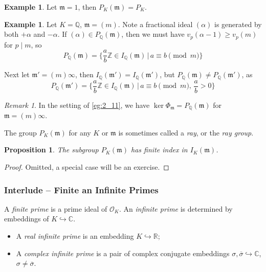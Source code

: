 \documentclass[11pt]{article}
\theoremstyle{definition}
\newtheorem{example}[definition]{Example}
\theoremstyle{plain}
\newtheorem{proposition}[definition]{Proposition}
\theoremstyle{remark}
\newtheorem{remark}[definition]{Remark}
\newcommand{\ZZ}{\mathbb{Z}}
\newcommand{\QQ}{\mathbb{Q}}
\newcommand{\RR}{\mathbb{R}}
\newcommand{\CC}{\mathbb{C}}
\newcommand{\cO}{\mathcal{O}}
\newcommand{\fm}{\mathfrak{m}}
\begin{document}
\begin{example}\label{eg:2_13}
    Let $\fm = 1$, then $P_K(\fm) = P_K$.
\end{example}

\begin{example}\label{eg:2_14}
    Let $K = \QQ$, $\fm = (m)$. Note a fractional ideal $(\alpha)$ is generated by both $+\alpha$ and $-\alpha$. If $(\alpha) \in P_\QQ(\fm)$, then we must have $v_p(\alpha - 1) \ge v_p(m)$ for $p \mid m$, so
    \begin{equation*}
        P_\QQ(\fm) = \bigg\{\frac{a}{b}\ZZ \in I_\QQ(\fm) \,\big\vert\, a \equiv b \pmod{m}\bigg\}
    \end{equation*}

    \noindent Next let $\fm' = (m) \infty$, then $I_\QQ(\fm') = I_\QQ(\fm')$, but $P_\QQ(\fm) \neq P_\QQ(\fm')$, as
    \begin{equation*}
        P_\QQ(\fm') = \bigg\{\frac{a}{b}\ZZ \in I_\QQ(\fm) \,\big\vert\, a \equiv b \pmod{m},\, \frac{a}{b} > 0\bigg\}
    \end{equation*}
\end{example}

\begin{remark}\label{remark:2_15}
    In the setting of \autoref{eg:2_11}, we have $\ker \Phi_\fm = P_\QQ(\fm)$ for $\fm = (m) \infty$.
\end{remark}

The group $P_K(\fm)$ for any $K$ or $\fm$ is sometimes called a \emph{ray}, or the \emph{ray group}.

\begin{proposition}\label{prop:2_16}
    The subgroup $P_K(\fm)$ has finite index in $I_K(\fm)$.
\end{proposition}
\begin{proof}
    Omitted, a special case will be an exercise.
\end{proof}

\subsubsection*{Interlude -- Finite an Infinite Primes}
A \emph{finite prime} is a prime ideal of $\cO_K$. An \emph{infinite prime} is determined by embeddings of $K \hookrightarrow \CC$.
\begin{itemize}
    \item A \emph{real infinite prime} is an embedding $K \hookrightarrow \RR$;
    \item A \emph{complex infinite prime} is a pair of complex conjugate embeddings $\sigma, \overline{\sigma} \hookrightarrow \CC$, $\sigma \neq \overline{\sigma}$.
\end{itemize}
\end{document}
